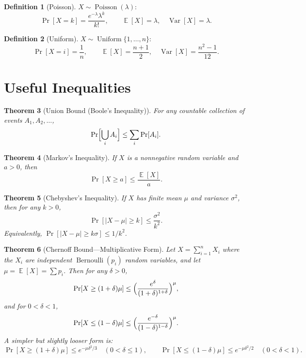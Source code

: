 \documentclass[twoside,12pt]{book}
\theoremstyle{plain}
\newtheorem{theorem}{Theorem}[chapter]
\theoremstyle{definition}
\newtheorem{definition}[theorem]{Definition}
\theoremstyle{remark}
\newcommand{\Exp}{\operatorname{\mathbb{E}}}
\newcommand{\Var}{\operatorname{Var}}
\begin{document}
\begin{definition}[Poisson]
$X \sim \operatorname{Poisson}(\lambda)$:
\[
\Pr[X = k] = \frac{e^{-\lambda} \lambda^k}{k!},\qquad
\Exp[X] = \lambda,\quad \Var[X] = \lambda.
\]
\end{definition}

\begin{definition}[Uniform]
$X \sim \operatorname{Uniform}\{1, \ldots, n\}$:
\[
\Pr[X = i] = \frac{1}{n},\qquad
\Exp[X] = \frac{n+1}{2},\quad \Var[X] = \frac{n^2 - 1}{12}.
\]
\end{definition}

\section{Useful Inequalities}
\label{app:sec:inequalities}

\begin{theorem}[Union Bound (Boole's Inequality)]
For any countable collection of events $A_1, A_2, \ldots$,
\[
\Pr\Bigl[\bigcup_{i} A_i\Bigr] \leq \sum_{i} \Pr[A_i].
\]
\end{theorem}

\begin{theorem}[Markov's Inequality]
\label{app:thm:markov}
If $X$ is a nonnegative random variable and $a > 0$, then
\[
\Pr[X \geq a] \leq \frac{\Exp[X]}{a}.
\]
\end{theorem}

\begin{theorem}[Chebyshev's Inequality]
\label{app:thm:chebyshev}
If $X$ has finite mean $\mu$ and variance $\sigma^2$, then for any $k > 0$,
\[
\Pr[|X - \mu| \geq k] \leq \frac{\sigma^2}{k^2}.
\]
Equivalently, $\Pr[|X - \mu| \geq k\sigma] \leq 1/k^2$.
\end{theorem}

\begin{theorem}[Chernoff Bound---Multiplicative Form]
\label{app:thm:chernoff}
Let $X = \sum_{i=1}^{n} X_i$ where the $X_i$ are independent
$\operatorname{Bernoulli}(p_i)$ random variables, and let
$\mu = \Exp[X] = \sum p_i$. Then for any $\delta > 0$,
\[
\Pr[X \geq (1+\delta)\mu] \leq
\Bigl(\frac{e^{\delta}}{(1+\delta)^{1+\delta}}\Bigr)^{\mu},
\]
and for $0 < \delta < 1$,
\[
\Pr[X \leq (1-\delta)\mu] \leq
\Bigl(\frac{e^{-\delta}}{(1-\delta)^{1-\delta}}\Bigr)^{\mu}.
\]
A simpler but slightly looser form is:
\[
\Pr[X \geq (1+\delta)\mu] \leq e^{-\mu\delta^2/3}\quad (0 < \delta \leq 1),
\qquad
\Pr[X \leq (1-\delta)\mu] \leq e^{-\mu\delta^2/2}\quad (0 < \delta < 1).
\]
\end{theorem}
\end{document}
